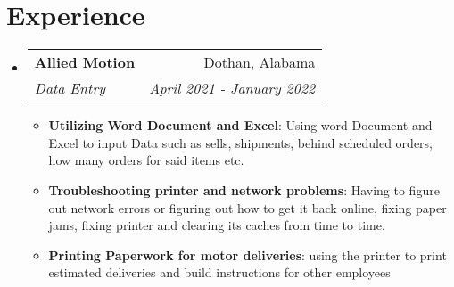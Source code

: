 \documentclass[letterpaper,11pt]{article}
\makeatletter
\newcommand{\resumeItem}[2]{
  \item[$\circ$]\small{
    \textbf{#1}{: #2 \vspace{-2pt}}
  }
}
\newcommand{\resumeSubheading}[4]{
  \vspace{-1pt}\item[]
    \begin{tabular*}{0.97\textwidth}{l@{\extracolsep{\fill}}r}
      \textbf{#1} & #2 \\
      \textit{\small#3} & \textit{\small #4} \\
    \end{tabular*}\vspace{-5pt}
}
\newcommand{\resumeSubHeadingListStart}{\begin{itemize}[ leftmargin=*]}
\newcommand{\resumeSubHeadingListEnd}{\end{itemize}}
\newcommand{\resumeItemListStart}{\begin{itemize}}
\newcommand{\resumeItemListEnd}{\end{itemize}\vspace{-5pt}}
\makeatother
\begin{document}
\section{Experience}
  \resumeSubHeadingListStart

    \resumeSubheading
    {{Allied Motion}}{Dothan, Alabama}
      {Data Entry}{April 2021 - January 2022}
      \resumeItemListStart
        \resumeItem{Utilizing Word Document and Excel}
          {Using word Document and Excel to input Data such as sells, shipments, behind scheduled orders, how many orders for said items etc.}
        \resumeItem{Troubleshooting printer and network problems}
          {Having to figure out network errors or figuring out how to get it back online, fixing paper jams, fixing printer and clearing its caches from time to time.}
          \resumeItem{Printing Paperwork for motor deliveries}
          {using the printer to print estimated deliveries and build instructions for other employees}
      \resumeItemListEnd
  \resumeSubHeadingListEnd
\end{document}
